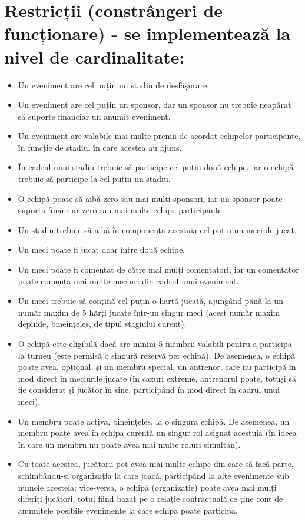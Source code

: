 \documentclass[a4paper,11pt]{article}
\begin{document}
\section{Restricții (constrângeri de funcționare) - se implementează la nivel de cardinalitate:}
\begin{itemize}
    \item Un eveniment are cel puțin un stadiu de desfășurare.
    \item Un eveniment are cel puțin un sponsor, dar un sponsor nu trebuie neapărat să suporte financiar un anumit eveniment.
    \item Un eveniment are valabile mai multe premii de acordat echipelor participante, în funcție de stadiul în care acestea au ajuns.
    \item În cadrul unui stadiu trebuie să participe cel puțin două echipe, iar o echipă trebuie să participe la cel puțin un stadiu.
    \item O echipă poate să aibă zero sau mai mulți sponsori, iar un sponsor poate suporta financiar zero sau mai multe echipe participante.
    \item Un stadiu trebuie să aibă în componența acestuia cel puțin un meci de jucat.
    \item Un meci poate fi jucat doar între două echipe.
    \item Un meci poate fi comentat de către mai mulți comentatori, iar un comentator poate comenta mai multe meciuri din cadrul unui eveniment.
    \item Un meci trebuie să conțină cel puțin o hartă jucată, ajungând până la un număr maxim de 5 hărți jucate într-un singur meci (acest număr maxim depinde, bineînțeles, de tipul stagiului curent).
    \item O echipă este eligibilă dacă are minim 5 membrii valabili pentru a participa la turneu (este permisă o singură rezervă per echipă). De asemenea, o echipă poate avea, opțional, și un membru special, un antrenor, care nu participă în mod direct în meciurile jucate (în cazuri extreme, antrenorul poate, totuși să fie considerat și jucător în sine, participând în mod direct în cadrul unui meci).
    \item Un membru poate activa, bineînțeles, la o singură echipă. De asemenea, un membru poate avea în echipa curentă un singur rol asignat acestuia (în ideea în care un membru nu poate avea mai multe roluri simultan).
    \item Cu toate acestea, jucătorii pot avea mai multe echipe din care să facă parte, schimbându-și organizația la care joacă, participând la alte evenimente sub numele acesteia; vice-versa, o echipă (organizație) poate avea mai mulți diferiți jucători, totul fiind bazat pe o relație contractuală ce ține cont de anumitele posibile evenimente la care echipa poate participa.
\end{itemize}
\end{document}
